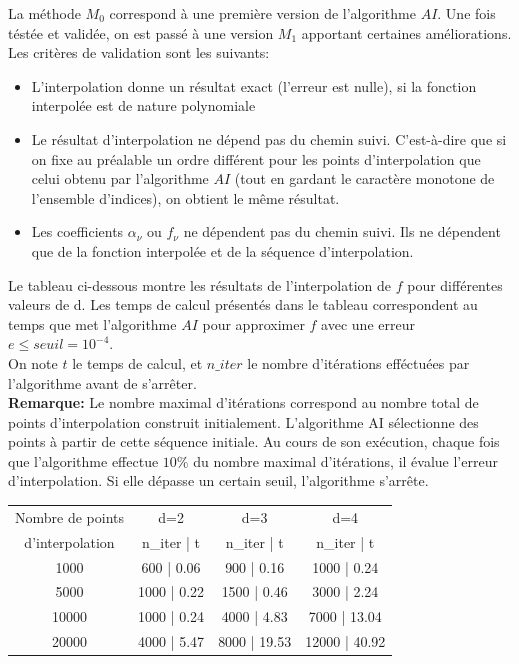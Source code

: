 \vspace{0.5cm}
La méthode $M_0$ correspond à une première version de l'algorithme $AI$. Une fois téstée et validée, on est passé
à une version $M_1$ apportant certaines améliorations.
Les critères de validation sont les suivants:
\begin{itemize}
		\item L'interpolation donne un résultat exact (l'erreur est nulle), si la fonction interpolée est de nature
		polynomiale
		\item Le résultat d'interpolation ne dépend pas du chemin suivi. C'est-à-dire que si on fixe au préalable un ordre différent pour les points
		d'interpolation que celui obtenu par l'algorithme $AI$ (tout en gardant le caractère monotone de l'ensemble d'indices), on obtient le même résultat.
		\item Les coefficients $\alpha_{\nu}$ ou $f_{\nu}$  ne dépendent pas du chemin suivi. Ils ne dépendent que de la fonction interpolée et de la séquence d'interpolation.
\end{itemize}

Le tableau ci-dessous montre les résultats de l'interpolation de $f$ pour différentes valeurs de d.
Les temps de calcul présentés dans le tableau correspondent au temps que met l'algorithme $AI$
pour approximer $f$ avec une erreur $e \leq seuil=10^{-4}$. \\
On note $t$ le temps de calcul, et $n\_iter$ le nombre d'itérations efféctuées par l'algorithme avant de s'arrêter.\\

\textbf{Remarque:} Le nombre maximal d'itérations correspond au nombre total de points d'interpolation construit initialement. L'algorithme AI
sélectionne des points à partir de cette séquence initiale. Au cours de son exécution, chaque fois que l'algorithme effectue $10\%$ du nombre maximal d'itérations, il évalue l'erreur d'interpolation.
Si elle dépasse un certain seuil, l'algorithme s'arrête.
\begin{center}
\begin{tabular}{|*{4}{c|}}
  	\hline
		Nombre de points & 			d=2			 		&     d=3      & 		d=4     	\\
		d'interpolation  &	n\_iter | t   	&	 n\_iter | t &  n\_iter | t \\
		\hline
		1000 						 &   600 | 0.06			&	 900 | 0.16  &  1000 | 0.24 \\
		5000 						 &  1000 | 0.22     & 1500 | 0.46  &  3000 | 2.24 \\
		10000 					 &  1000 | 0.24     & 4000 | 4.83  &  7000 | 13.04	\\
		20000						 &  4000 | 5.47     & 8000 | 19.53 & 12000 | 40.92 \\
		\hline
\end{tabular}
\end{center}

